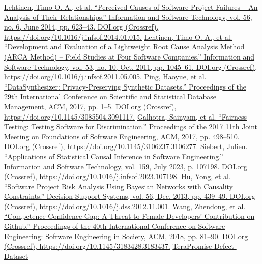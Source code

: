 \documentclass[sigconf,review,anonymous,nonacm=true]{acmart}
\begin{document}
% 
% 
\begin{thebibliography}{99}
    \href{https://tinyurl.com/3u92wr93}{Lehtinen, Timo O. A., et al. “Perceived Causes of Software Project Failures – An Analysis of Their Relationships.” Information and Software Technology, vol. 56, no. 6, June 2014, pp. 623–43. DOI.org (Crossref), https://doi.org/10.1016/j.infsof.2014.01.015.}
    \href{https://tinyurl.com/3xtz46eu}{Lehtinen, Timo O. A., et al. “Development and Evaluation of a Lightweight Root Cause Analysis Method (ARCA Method) – Field Studies at Four Software Companies.” Information and Software Technology, vol. 53, no. 10, Oct. 2011, pp. 1045–61. DOI.org (Crossref), https://doi.org/10.1016/j.infsof.2011.05.005.} 
    \href{https://dl.acm.org/doi/pdf/10.1145/3085504.3091117}{Ping, Haoyue, et al. “DataSynthesizer: Privacy-Preserving Synthetic Datasets.” Proceedings of the 29th International Conference on Scientific and Statistical Database Management, ACM, 2017, pp. 1–5. DOI.org (Crossref), https://doi.org/10.1145/3085504.3091117.}
    \href{https://dl.acm.org/doi/pdf/10.1145/3106237.3106277}{Galhotra, Sainyam, et al. “Fairness Testing: Testing Software for Discrimination.” Proceedings of the 2017 11th Joint Meeting on Foundations of Software Engineering, ACM, 2017, pp. 498–510. DOI.org (Crossref), https://doi.org/10.1145/3106237.3106277.}
    \href{https://tinyurl.com/52synths}{Siebert, Julien. “Applications of Statistical Causal Inference in Software Engineering.” Information and Software Technology, vol. 159, July 2023, p. 107198. DOI.org (Crossref), https://doi.org/10.1016/j.infsof.2023.107198.}
    \href{https://tinyurl.com/55zxxv57}{Hu, Yong, et al. “Software Project Risk Analysis Using Bayesian Networks with Causality Constraints.” Decision Support Systems, vol. 56, Dec. 2013, pp. 439–49. DOI.org (Crossref), https://doi.org/10.1016/j.dss.2012.11.001.}
    \href{https://tinyurl.com/4dmned9r}{Wang, Zhendong, et al. “Competence-Confidence Gap: A Threat to Female Developers’ Contribution on Github.” Proceedings of the 40th International Conference on Software Engineering: Software Engineering in Society, ACM, 2018, pp. 81–90. DOI.org (Crossref), https://doi.org/10.1145/3183428.3183437.}
    \href{https://github.com/awsm-research/Large-Defect-Prediction-Benchmark/tree/main/TeraPromise-defect-dataset}{TeraPromise-Defect-Dataset}

\end{thebibliography}
\end{document}
